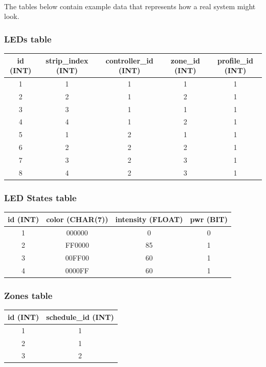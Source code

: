 \documentclass[onecolumn, draftclsnofoot,10pt, compsoc]{IEEEtran}
\begin{document}
			\noindent \\The tables below contain example data that represents how a real system might look.

			\subsubsection{LEDs table}
				\begin{tabular}{ |c|c|c|c|c| }
					\hline
					id (INT) & strip\_index (INT) & controller\_id (INT) & zone\_id (INT) & profile\_id (INT) \\
					\hline
					1 & 1 & 1 & 1 & 1 \\
					2 & 2 & 1 & 2 & 1 \\
					3 & 3 & 1 & 1 & 1 \\
					4 & 4 & 1 & 2 & 1 \\
					5 & 1 & 2 & 1 & 1 \\
					6 & 2 & 2 & 2 & 1 \\
					7 & 3 & 2 & 3 & 1 \\
					8 & 4 & 2 & 3 & 1 \\
					\hline
				\end{tabular}

			\subsubsection{LED States table}
				\begin{tabular}{ |c|c|c|c| }
					\hline
					id (INT) & color (CHAR(7)) & intensity (FLOAT) & pwr (BIT)\\
					\hline
					1 & 000000 & 0 & 0 \\
					2 & FF0000 & 85 & 1 \\
					3 & 00FF00 & 60 & 1 \\
					4 & 0000FF & 60 & 1 \\
					\hline
				\end{tabular}

			\subsubsection{Zones table}
				\begin{tabular}{ |c|c| }
					\hline
					id (INT) & schedule\_id (INT) \\
					\hline
					1 & 1 \\
					2 & 1 \\
					3 & 2 \\
					\hline
				\end{tabular}
\end{document}
